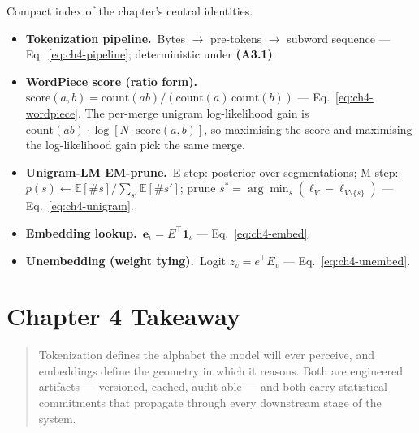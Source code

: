 \begin{derivledger}
Compact index of the chapter's central identities.
\begin{itemize}
  \item \textbf{Tokenization pipeline.}\
        Bytes $\to$ pre-tokens $\to$ subword sequence
        --- Eq.~\eqref{eq:ch4-pipeline}; deterministic under
        \textbf{(A3.1)}.
  \item \textbf{WordPiece score (ratio form).}\
        $\mathrm{score}(a,b) = \mathrm{count}(ab)/(\mathrm{count}(a)\,\mathrm{count}(b))$
        --- Eq.~\eqref{eq:ch4-wordpiece}. The per-merge unigram
        log-likelihood gain is $\mathrm{count}(ab)\cdot
        \log[N\cdot\mathrm{score}(a,b)]$, so maximising the score
        and maximising the log-likelihood gain pick the same merge.
  \item \textbf{Unigram-LM EM-prune.}\
        E-step: posterior over segmentations;
        M-step: $p(s) \leftarrow \mathbb{E}[\#s] / \sum_{s'} \mathbb{E}[\#s']$;
        prune $s^* = \arg\min_s (\ell_V - \ell_{V \setminus \{s\}})$
        --- Eq.~\eqref{eq:ch4-unigram}.
  \item \textbf{Embedding lookup.}\
        $\mathbf{e}_\iota = E^\top \mathbf{1}_\iota$ --- Eq.~\eqref{eq:ch4-embed}.
  \item \textbf{Unembedding (weight tying).}\
        Logit $z_v = e^\top E_v$ --- Eq.~\eqref{eq:ch4-unembed}.
\end{itemize}
\end{derivledger}

\section{Chapter 4 Takeaway}

\begin{quote}
Tokenization defines the alphabet the model will ever perceive, and
embeddings define the geometry in which it reasons. Both are
engineered artifacts — versioned, cached, audit-able — and both carry
statistical commitments that propagate through every downstream
stage of the system.
\end{quote}
